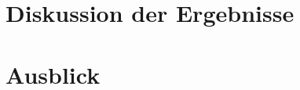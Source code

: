 \section{Diskussion der Ergebnisse}
\label{section:fazit}


\section{Ausblick}
\label{section:ausblick}
